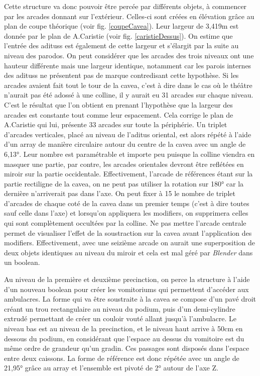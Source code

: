 Cette structure va donc pouvoir être percée par différents objets, à commencer par les arcades donnant sur l'extérieur. Celles-ci sont créées en élévation grâce au plan de coupe théorique (voir fig. \ref{coupeCavea}). Leur largeur de 3,419m est donnée par le plan de A.Caristie (voir fig. \ref{caristieDessus}). On estime que l'entrée des \glspl{aditus} est également de cette largeur et s'élargit par la suite au niveau des \gls{parodos}. On peut considérer que les arcades des trois niveaux ont une hauteur différente mais une largeur identique, notamment car les parois internes des \glspl{aditus} ne présentent pas de marque contredisant cette hypothèse. Si les arcades avaient fait tout le tour de la  \gls{cavea}, c'est à dire dans le cas où le théâtre n'aurait pas été adossé à une colline, il y aurait eu 31 arcades sur chaque niveau. C'est le résultat que l'on obtient en prenant l'hypothèse que la largeur des arcades est constante tout comme leur espacement. Cela corrige le plan de A.Caristie qui lui, présente 33 arcades sur toute la périphérie. Un triplet d'arcades verticales, placé au niveau de l'\gls{aditus} oriental, est alors répété à l'aide d'un \gls{array} de manière circulaire autour du centre de la \gls{cavea} avec un angle de 6,13°. Leur nombre est paramétrable et importe peu puisque la colline viendra en masquer une partie, par contre, les arcades orientales devront être reflétées en miroir sur la partie occidentale. Effectivement, l'arcade de références étant sur la partie rectiligne de la \gls{cavea}, on ne peut pas utiliser la rotation sur 180° car la dernière n'arriverait pas dans l'axe. On peut fixer à 15 le nombre de triplet d'arcades de chaque coté de la \gls{cavea} dans un premier temps (c'est à dire toutes sauf celle dans l'axe) et lorsqu'on appliquera les \glspl{modifier}, on supprimera celles qui sont complètement occultées par la colline. Ne pas mettre l'arcade centrale permet de visualiser l'effet de la soustraction sur la \gls{cavea} avant l'application des \glspl{modifier}. Effectivement, avec une seizième arcade on aurait une superposition de deux objets identiques au niveau du miroir et cela est mal géré par \textit{Blender} dans un \gls{boolean}. 

 Au niveau de la première et deuxième \gls{precinction}, on perce la structure à l'aide d'un nouveau \gls{boolean} pour créer les \glspl{vomitorium} qui permettent d'accéder aux  \glspl{ambulacre}. La forme qui va être soustraite à la \gls{cavea} se compose d'un pavé droit créant un trou rectangulaire au niveau du \gls{podium}, puis d'un demi-cylindre extrudé permettant de créer un couloir vouté allant jusqu'à l'\gls{ambulacre}. Le niveau bas est au niveau de la \gls{precinction}, et le niveau haut arrive à 50cm en dessous du  \gls{podium}, en considérant que l'espace au dessus du vomitoire est du même ordre de grandeur qu'un gradin. Ces passages sont disposés dans l'espace entre deux caissons. La forme de référence est donc répétée avec un angle de 21,95° grâce au \gls{array} et l'ensemble est pivoté de 2° autour de l'axe Z. 


